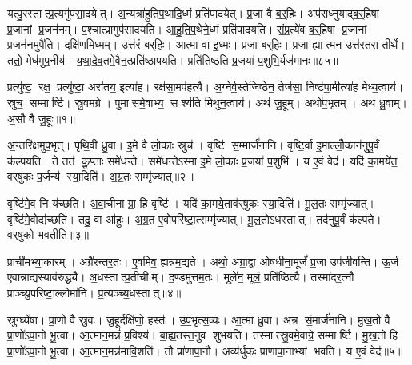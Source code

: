 यत्पु॒रस्तात्प्र॒त्यगु॑पसा॒दयेत्।
अ॒न्यत्रा॑हुतिप॒थादि॒ध्मं प्रति॑पादयेत्।
प्र॒जा वै ब॒र्॒हिः।
अप॑राध्नुयाद्ब॒र्॒हिषा प्र॒जानां प्र॒जन॑नम्।
प॒श्चात्प्रागुप॑सादयति।
आ॒हु॒ति॒प॒थेने॒ध्मं प्रति॑पादयति।
सं॒प्र॒त्ये॑व ब॒र्॒हिषा प्र॒जानां प्र॒जन॑न॒मुपै॑ति।
दक्षि॑णमि॒ध्मम्।
उत्त॑रं ब॒र्॒हिः।
आ॒त्मा वा इ॒ध्मः।
प्र॒जा ब॒र्॒हिः।
प्र॒जा ह्यात्मन॒ उत्त॑रतरा ती॒र्थे।
ततो॒ मेध॑मुप॒नीय॑।
य॒था॒दे॒व॒तमे॒वैन॒त्प्रति॑ष्ठापयति।
प्रति॑तिष्ठति प्र॒जया॑ प॒शुभि॒र्यज॑मानः॥८५॥\anuvakamend[वृ॒श्च॒ति॒ सा॒द॒ये॒दि॒ध्मः पञ्च॑ च]




\clearpage
{}
\setcounter{anuvakam}{0}

प्रत्यु॑ष्ट॒ रक्ष॒ प्रत्यु॑ष्टा॒ अरा॑तय॒ इत्या॑ह।
रक्ष॑सा॒मप॑हत्यै।
अ॒ग्नेर्व॒स्तेजि॑ष्ठेन॒ तेज॑सा॒ निष्ट॑पा॒मीत्या॑ह मेध्य॒त्वाय॑।
स्रुच॒ सम्मार्ष्टि।
स्रु॒वमग्रे।
पुमासमे॒वाभ्य॒ सश्य॑ति मिथुन॒त्वाय॑।
अथ॑ जु॒हूम्।
अथो॑प॒भृतम्।
अथ॑ ध्रु॒वाम्।
अ॒सौ वै जु॒हूः॥१॥

अ॒न्तरि॑क्षमुप॒भृत्।
पृ॒थि॒वी ध्रु॒वा।
इ॒मे वै लो॒काः स्रुच॑।
वृष्टि॑ स॒म्मार्ज॑नानि।
वृष्टि॒र्वा इ॒माल्लोँ॒कान॑नुपू॒र्वं क॑ल्पयति।
ते तत॑ कॢ॒प्ताः समे॑धन्ते।
समे॑धन्तेऽस्मा इ॒मे लो॒काः प्र॒जया॑ प॒शुभि॑।
य ए॒वं वेद॑।
यदि॑ का॒मये॑त॒ वर्‌षु॑कः प॒र्जन्य॑ स्या॒दिति॑।
अ॒ग्र॒तः सम्मृ॑ज्यात्॥२॥

वृष्टि॑मे॒व नि य॑च्छति।
अ॒वा॒चीनाग्रा॒ हि वृष्टि॑।
यदि॑ का॒मये॒ताव॑र्‌षुकः स्या॒दिति॑।
मू॒ल॒तः सम्मृ॑ज्यात्।
वृष्टि॑मे॒वोद्य॑च्छति।
तदु॒ वा आ॑हुः।
अ॒ग्र॒त ए॒वोपरि॑ष्टा॒त्सम्मृ॑ज्यात्।
मू॒ल॒तो॑ऽधस्तात्।
तद॑नुपू॒र्वं क॑ल्पते।
वर्‌षु॑को भव॒तीति॑॥३॥

प्राची॑मभ्या॒कारम्।
अग्रै॑रन्तर॒तः।
ए॒वमि॑व॒ ह्यन्न॑म॒द्यते।
अथो॒ अग्रा॒द्वा ओष॑धीना॒मूर्जं॑ प्र॒जा उप॑जीवन्ति।
ऊ॒र्ज ए॒वान्नाद्य॒स्याव॑रुद्ध्यै।
अ॒धस्तात्प्र॒तीचीम्।
द॒ण्डमु॑त्तम॒तः।
मूले॑न॒ मूलं॒ प्रति॑ष्ठित्यै।
तस्मा॑दर॒त्नौ प्राञ्च्यु॒परि॑ष्टा॒ल्लोमा॑नि।
प्र॒त्यञ्च्य॒धस्तात्॥४॥

स्रुग्घ्ये॑षा।
प्रा॒णो वै स्रु॒वः।
जु॒हूर्दक्षि॑णो॒ हस्त॑।
उ॒प॒भृत्स॒व्यः।
आ॒त्मा ध्रु॒वा।
अन्न सं॒मार्ज॑नानि।
मु॒ख॒तो वै प्रा॒णो॑ऽपा॒नो भू॒त्वा।
आ॒त्मान॒मन्नं॑ प्र॒विश्य॑।
बा॒ह्य॒तस्त॒नुव शुभयति।
तस्मात्स्रु॒वमे॒वाग्रे॒ सम्मार्ष्टि।
मु॒ख॒तो हि प्रा॒णो॑ऽपा॒नो भू॒त्वा।
आ॒त्मान॒मन्न॑मावि॒शति॑।
तौ प्रा॑णापा॒नौ।
अव्य॑र्धुकः प्राणापा॒नाभ्यां भवति।
य ए॒वं वेद॑॥५॥\anuvakamend[जु॒हूर्मृ॑ज्याद्भव॒तीति॑ प्र॒त्यञ्च्य॒धस्तान्मार्ष्टि॒ पञ्च॑ च]

